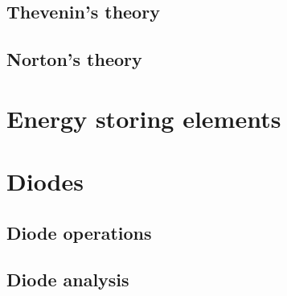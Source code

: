 \documentclass[a4paper]{book}
\begin{document}
  \subsection{Thevenin's theory}
  \subsection{Norton's theory}
\section{Energy storing elements}
\section{Diodes}
  \subsection{Diode operations}
  \subsection{Diode analysis}
\end{document}

